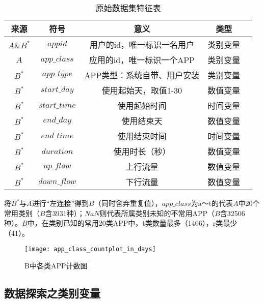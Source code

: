 \documentclass[withoutpreface,bwprint]{cumcmthesis}
\begin{document}
\begin{table}[!htbp]
    \caption{原始数据集特征表}\label{tab:001} \centering
    \begin{tabular}{ccccc}
        \toprule[1.5pt]
        来源       & 符号            & 意义              & 类型   \\
        \midrule[1pt]
        $A\&B^*$ & $appid$       & 用户的id，唯一标识一名用户  & 类别变量 \\
        $A$      & $app\_class$  & 应用的id，唯一标识一个APP & 类别变量 \\
        $B^*$    & $app\_type$   & APP类型：系统自带、用户安装 & 类别变量 \\
        $B^*$    & $start\_day$  & 使用起始天，取值1-30    & 数值变量 \\
        $B^*$    & $start\_time$ & 使用起始时间          & 时间变量 \\
        $B^*$    & $end\_day$    & 使用结束天           & 数值变量 \\
        $B^*$    & $end\_time$   & 使用结束时间          & 时间变量 \\
        $B^*$    & $duration$    & 使用时长（秒）         & 数值变量 \\
        $B^*$    & $up\_flow$    & 上行流量            & 数值变量 \\
        $B^*$    & $down\_flow$  & 下行流量            & 数值变量 \\
        \bottomrule[1.5pt]
    \end{tabular}
\end{table}

将$B^*$与$A$进行“左连接”得到$B$（同时舍弃重复值），$app\_class$为a～t的代表$A$中20个常用类别（$B$含3931种）；$NaN$则代表所属类别未知的不常用APP（$B$含32506种）。$B$中，在类别已知的常用20类APP中，t类数量最多（1406），r类最少（41）。

\begin{figure}[!htbp]
    \centering
    \texttt{[image: app\_class\_countplot\_in\_days]}
    \caption{B中各类APP计数图}
    \label{fig:001}
\end{figure}

\subsection{数据探索之类别变量}
\end{document}
